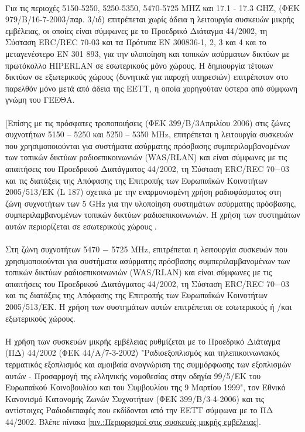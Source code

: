 \documentclass[a4paper, 12pt, twoside]{report}
\begin{document}
{{{{{{			\paragraph{}{Για τις περιοχές 5150-5250, 5250-5350, 5470-5725 ΜΗΖ και 17.1 - 17.3 GΗΖ, (ΦΕΚ 979/Β/16-7-2003/παρ. 3/ιδ) επιτρέπεται χωρίς άδεια η λειτουργία συσκευών μικρής εμβέλειας, οι οποίες είναι σύμφωνες με το Προεδρικό Διάταγμα 44/2002, τη Σύσταση ERC/REC 70-03 και τα Πρότυπα EN 300836-1, 2, 3 και 4 και το μεταγενέστερο EN 301 893, για την υλοποίηση και τοπικών ασύρματων δικτύων με πρωτόκολλο HIPERLAN σε εσωτερικούς μόνο χώρους. Η δημιουργία τέτοιων δικτύων σε εξωτερικούς χώρους (δυνητικά για παροχή υπηρεσιών) επιτρέποταν στο παρελθόν μόνο μετά από άδεια της ΕΕΤΤ, η οποία χορηγούταν ύστερα από σύμφωνη γνώμη του ΓΕΕΘΑ. 
			}
			\paragraph{}[Επίσης με τις πρόσφατες τροποποιήσεις (ΦΕΚ 399/Β/3Απριλίου 2006) στις ζώνες συχνοτήτων 5150 – 5250 και 5250 – 5350 ΜΗz, επιτρέπεται η λειτουργία συσκευών που χρησιμοποιούνται για συστήματα ασύρματης πρόσβασης συμπεριλαμβανομένων των τοπικών δικτύων ραδιοεπικοινωνιών (WAS/RLAN) και είναι σύμφωνες με τις απαιτήσεις του Προεδρικού Διατάγματος 44/2002, τη Σύσταση ERC/REC 70−03 και τις διατάξεις της Απόφασης της Επιτροπής των Ευρωπαϊκών Κοινοτήτων 2005/513/ΕΚ (L 187) σχετικά με την εναρμονισμένη χρήση ραδιοφάσματος στη ζώνη συχνοτήτων των 5 GHz για την υλοποίηση συστημάτων ασύρματης πρόσβασης, συμπεριλαμβανομένων τοπικών δικτύων ραδιοεπικοινωνιών. Η χρήση των συστημάτων αυτών περιορίζεται σε εσωτερικούς χώρους .
			}
			\paragraph{}{Στη ζώνη συχνοτήτων 5470 − 5725 ΜΗz, επιτρέπεται η λειτουργία συσκευών που χρησιμοποιούνται για συστήματα ασύρματης πρόσβασης συμπεριλαμβανομένων των τοπικών δικτύων ραδιοεπικοινωνιών (WAS/RLAN) και είναι σύμφωνες με τις απαιτήσεις του Προεδρικού Διατάγματος 44/2002, τη Σύσταση ERC/REC 70−03 και τις διατάξεις της Απόφασης της Επιτροπής των Ευρωπαϊκών Κοινοτήτων 2005/513/ΕΚ. Η χρήση των συστημάτων αυτών επιτρέπεται σε εσωτερικούς ή /και εξωτερικούς χώρους.
			}
			\paragraph{}{Η χρήση των συσκευών μικρής εμβέλειας ρυθμίζεται με το Προεδρικό Διάταγμα (ΠΔ) 44/2002 (ΦΕΚ 44/Α/7-3-2002) "Ραδιοεξοπλισμός και τηλεπικοινωνιακός τερματικός εξοπλισμός και αμοιβαία αναγνώριση της συμμόρφωσης των εξοπλισμών αυτών - Προσαρμογή της ελληνικής νομοθεσίας στην οδηγία 99/5/ΕΚ του Ευρωπαϊκού Κοινοβουλίου και του Συμβουλίου της 9 Μαρτίου 1999", τον Εθνικό Κανονισμό Κατανομής Ζωνών Συχνοτήτων (ΦΕΚ 399/Β/3-4-2006) και τις αντίστοιχες Ραδιοδιεπαφές που εκδίδονται από την ΕΕΤΤ σύμφωνα με το ΠΔ 44/2002. Βλέπε πίνακα \ref{πιν.:Περιορισμοί στις συσκευές μικρής εμβέλειας}.
			}
			
}}}}}
\end{document}

